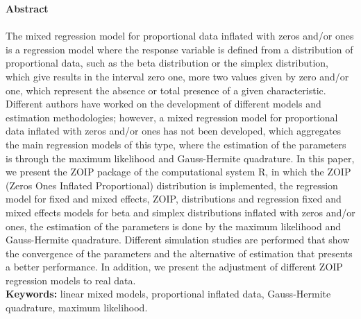 \textbf{\LARGE Abstract}\\\\
The mixed regression model for proportional data inflated with zeros and/or ones is a regression model where the response variable is defined from a distribution of proportional data, such as the beta distribution or the simplex distribution, which give results in the interval zero one, more two values given by zero and/or one, which represent the absence or total presence of a given characteristic. Different authors have worked on the development of different models and estimation methodologies; however, a mixed regression model for proportional data inflated with zeros and/or ones has not been developed, which aggregates the main regression models of this type, where the estimation of the parameters is through the maximum likelihood and Gauss-Hermite quadrature. In this paper, we present the ZOIP package of the computational system R, in which the ZOIP (Zeros Ones Inflated Proportional) distribution is implemented, the regression model for fixed and mixed effects, ZOIP, distributions and regression fixed and mixed effects models for beta and simplex distributions inflated with zeros and/or ones, the estimation of the parameters is done by the maximum likelihood and Gauss-Hermite quadrature. Different simulation studies are performed that show the convergence of the parameters and the alternative of estimation that presents a better performance. In addition, we present the adjustment of different ZOIP regression models to real data.\\

\textbf{\small Keywords:} linear mixed models, proportional inflated data, Gauss-Hermite quadrature, maximum likelihood.\\